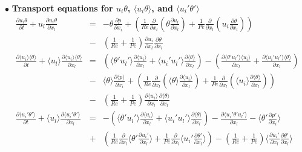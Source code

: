 \documentclass[a4paper,11pt]{article}
\begin{document}
\noindent $\bullet$  \textbf{Transport equations for $u_i\theta$, $\langle u_i\theta\rangle$, and $\langle u_i'\theta'\rangle$}
\begin{eqnarray}
\frac{\partial u_i\theta }{\partial t}
+u_l\frac{\partial u_i\theta }{\partial x_l}
&=&-\theta \frac{ \partial p}{\partial x_i}
+(\frac{1}{Re}\frac{\partial }{\partial x_l}(\theta\frac{\partial u_i }{\partial x_l})+\frac{1}{Pe}\frac{\partial }{\partial x_l}(u_i\frac{\partial \theta }{\partial x_l})) \nonumber \\
&-&(\frac{1}{Re}+\frac{1}{Pe})\frac{\partial u_i }{\partial x_l}\frac{\partial \theta }{\partial x_l}  \\ 
\frac{\partial \langle u_i\rangle \langle \theta\rangle }{\partial t}
+\langle u_l\rangle \frac{\partial \langle u_i\rangle \langle \theta\rangle }{\partial x_l}
&=&(\langle \theta'u_l'\rangle \frac{\partial \langle u_i \rangle}{\partial x_l}+\langle u_i'u_l'\rangle \frac{\partial \langle \theta \rangle  }{\partial x_l})
-(\frac{\partial \langle \theta'u_l'\rangle \langle u_i \rangle }{\partial x_l}+\frac{\partial \langle u_i'u_l'\rangle \langle \theta \rangle }{\partial x_l}) \nonumber \\
&-&\langle \theta \rangle \frac{\partial \langle p \rangle }{\partial x_i} 
+(\frac{1}{Re}\frac{\partial}{\partial x_l}(\langle \theta\rangle \frac{\partial \langle u_i\rangle}{\partial x_l}) + \frac{1}{Pe}\frac{\partial}{\partial x_l}(\langle u_i \rangle \frac{\partial \langle \theta\rangle}{\partial x_l})) \nonumber \\
&-&(\frac{1}{Re}+\frac{1}{Pe})\frac{\partial \langle u_i\rangle }{\partial x_l}\frac{\partial \langle \theta \rangle}{\partial x_l} \\
\frac{\partial \langle u_i'\theta'\rangle }{\partial t}
+\langle u_l\rangle \frac{\partial \langle u_i'\theta'\rangle }{\partial x_l}
&=&-(\langle \theta'u_l'\rangle \frac{\partial \langle u_i \rangle  }{\partial x_l}
+\langle u_i'u_l'\rangle \frac{\partial \langle \theta \rangle  }{\partial x_l})
-\frac{\partial \langle u_i'\theta'u_l'\rangle}{\partial x_l}  
-\langle \theta' \frac{\partial p' }{\partial x_i}\rangle \nonumber \\
&+&(\frac{1}{Re}\frac{\partial }{\partial x_l}\langle \theta' \frac{\partial u_i' }{\partial x_l}\rangle+\frac{1}{Pe}\frac{\partial }{\partial x_l}\langle u_i'\frac{\partial \theta' }{\partial x_l}\rangle )
-(\frac{1}{Re}+\frac{1}{Pe})\langle \frac{\partial u_i' }{\partial x_l}\frac{\partial \theta' }{\partial x_l}\rangle  
\end{eqnarray}
\end{document}
